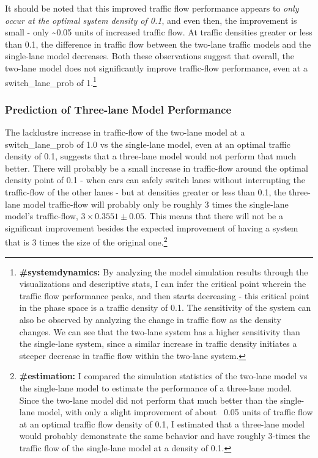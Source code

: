 \documentclass[11pt]{article}
\begin{document}
It should be noted that this improved traffic flow performance appears
to \emph{only occur at the optimal system density of 0.1}, and even
then, the improvement is small - only \textasciitilde{}0.05 units of
increased traffic flow. At traffic densities greater or less than 0.1,
the difference in traffic flow between the two-lane traffic models and
the single-lane model decreases. Both these observations suggest that
overall, the two-lane model does not significantly improve traffic-flow
performance, even at a switch\_lane\_prob of 1.\footnote{\textbf{\#systemdynamics: }By analyzing the model simulation results through the visualizations and descriptive stats, I can infer the critical point wherein the traffic flow performance peaks, and then starts decreasing - this critical point in the phase space is a traffic density of 0.1. The sensitivity of the system can also be observed by analyzing the change in traffic flow as the density changes. We can see that the two-lane system has a higher sensitivity than the single-lane system, since a similar increase in traffic density initiates a steeper decrease in traffic flow within the two-lane system.}

\subsubsection{Prediction of Three-lane Model Performance}

The lacklustre increase in traffic-flow of the two-lane model at a
switch\_lane\_prob of 1.0 vs the single-lane model, even at an optimal
traffic density of 0.1, suggests that a three-lane model would not
perform that much better. There will probably be a small increase in
traffic-flow around the optimal density point of 0.1 - when cars can
safely switch lanes without interrupting the traffic-flow of the other
lanes - but at densities greater or less than 0.1, the three-lane model
traffic-flow will probably only be roughly 3 times the single-lane
model's traffic-flow, \(3 \times 0.3551\pm 0.05\). This means that there will not be a significant
improvement besides the expected improvement of having a system that is
3 times the size of the original one.\footnote{\textbf{\#estimation:} I compared the simulation statistics of the two-lane model vs the single-lane model to estimate the performance of a three-lane model. Since the two-lane model did not perform that much better than the single-lane model, with only a slight improvement of about ~0.05 units of traffic flow at an optimal traffic flow density of 0.1, I estimated that a three-lane model would probably demonstrate the same behavior and have roughly 3-times the traffic flow of the single-lane model at a density of 0.1.}
\end{document}
